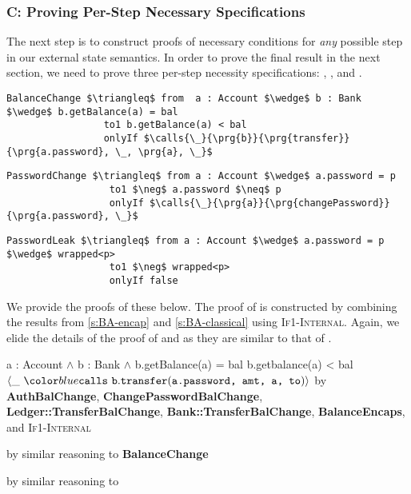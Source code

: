 \subsubsection{C: Proving Per-Step Necessary Specifications}
The next step is to construct proofs of necessary conditions for
\emph{any} possible step in our external state semantics.
In order to prove the final result in the next section,
we need to prove three per-step necessity specifications: , , and .
\begin{lstlisting}[language = Chainmail, mathescape=true, frame=lines]
BalanceChange $\triangleq$ from  a : Account $\wedge$ b : Bank $\wedge$ b.getBalance(a) = bal
                 to1 b.getBalance(a) < bal
                 onlyIf $\calls{\_}{\prg{b}}{\prg{transfer}}{\prg{a.password}, \_, \prg{a}, \_}$
\end{lstlisting}
\begin{lstlisting}[language = Chainmail, mathescape=true, frame=lines]
PasswordChange $\triangleq$ from a : Account $\wedge$ a.password = p
                  to1 $\neg$ a.password $\neq$ p
                  onlyIf $\calls{\_}{\prg{a}}{\prg{changePassword}}{\prg{a.password}, \_}$
\end{lstlisting}
\begin{lstlisting}[language = Chainmail, mathescape=true, frame=lines]
PasswordLeak $\triangleq$ from a : Account $\wedge$ a.password = p $\wedge$ wrapped<p>
                  to1 $\neg$ wrapped<p>
                  onlyIf false
\end{lstlisting}
We provide the proofs of these below. The proof of  is constructed
by combining the results from \ref{s:BA-encap} and \ref{s:BA-classical} using \textsc{If1-Internal}. 
Again, we elide the details of the proof of  and  as they are similar to that
of . \\
\noindent
\begin{proofexample}
	{\proofstepwithrule
			{\onlyIfSingleEx
					{a : Account $\wedge$ b : Bank $\wedge$ b.getBalance(a) = bal}
					{b.getbalance(a) < bal}
					{$\calls{\_}{\prg{b}}{\prg{transfer}}{\prg{a.password, amt, a, to}}$}
					}
				{by \textbf{AuthBalChange}, \textbf{ChangePasswordBalChange}, \textbf{Ledger::TransferBalChange}, \textbf{Bank::TransferBalChange}, \textbf{BalanceEncaps}, and \textsc{If1-Internal}}
		}
\endproofsteps
\end{proofexample}
\begin{proofexample}
	{
			{by similar reasoning to \textbf{BalanceChange}}
	}
\endproofsteps
\end{proofexample}
\begin{proofexample}
	{
			{by similar reasoning to }
	}
\endproofsteps
\end{proofexample}
